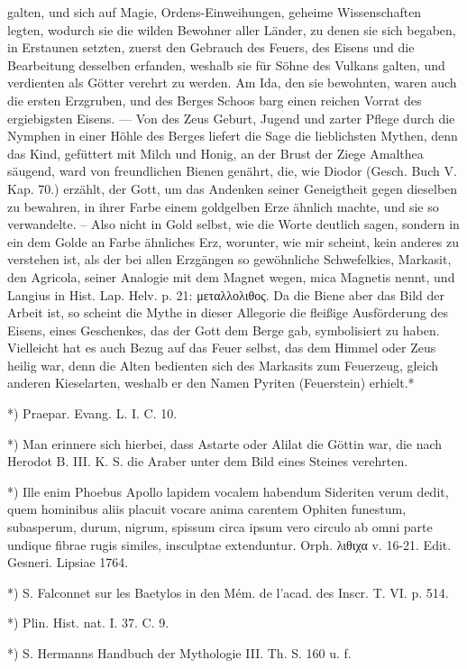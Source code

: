 \documentclass[a4paper, 11pt, oneside, polutonikogreek, german]{article}
\begin{document}
galten, und sich auf Magie, Ordens-Einweihungen, geheime Wissenschaften legten, wodurch sie die wilden Bewohner aller Länder, zu denen sie sich begaben, in Erstaunen setzten, zuerst den Gebrauch des Feuers, des Eisens und die Bearbeitung desselben erfanden, weshalb sie für Söhne des Vulkans galten, und verdienten als Götter verehrt zu werden. Am Ida, den sie bewohnten, waren auch die ersten Erzgruben, und des Berges Schoos barg einen reichen Vorrat des ergiebigsten Eisens. --- Von des Zeus Geburt, Jugend und zarter Pflege durch die Nymphen in einer Höhle des Berges liefert die Sage die lieblichsten Mythen, denn das Kind, gefüttert mit Milch und Honig, an der Brust der Ziege Amalthea säugend, ward von freundlichen Bienen genährt, die, wie Diodor (Gesch. Buch V. Kap. 70.) erzählt, der Gott, um das Andenken seiner Geneigtheit gegen dieselben zu bewahren, in ihrer Farbe einem goldgelben Erze ähnlich machte, und sie so verwandelte. -- Also nicht in Gold selbst, wie die Worte deutlich sagen, sondern in ein dem Golde an Farbe ähnliches Erz, worunter, wie mir scheint, kein anderes zu verstehen ist, als der bei allen Erzgängen so gewöhnliche Schwefelkies, Markasit, den Agricola, seiner Analogie mit dem Magnet wegen, mica Magnetis nennt, und Langius in Hist. Lap. Helv. p. 21: μεταλλολιθος. Da die Biene aber das Bild der Arbeit ist, so scheint die Mythe in dieser Allegorie die fleißige Ausförderung des Eisens, eines Geschenkes, das der Gott dem Berge gab, symbolisiert zu haben. Vielleicht hat es auch Bezug auf das Feuer selbst, das dem Himmel oder Zeus heilig war, denn die Alten bedienten sich des Markasits zum Feuerzeug, gleich anderen Kieselarten, weshalb er den Namen Pyriten (Feuerstein) erhielt.*

*) Praepar. Evang. L. I. C. 10.

*) Man erinnere sich hierbei, dass Astarte oder Alilat die Göttin war, die nach Herodot B. III. K. S. die Araber unter dem Bild eines Steines verehrten.

*) Ille enim Phoebus Apollo lapidem vocalem habendum Sideriten verum dedit, quem hominibus aliis placuit vocare anima carentem Ophiten funestum, subasperum, durum, nigrum, spissum circa ipsum vero circulo ab omni parte undique fibrae rugis similes, insculptae extenduntur.
Orph. λιθιχα v. 16-21.
Edit. Gesneri. Lipsiae 1764.

*) S. Falconnet sur les Baetylos in den Mém. de l'acad. des Inscr. T. VI. p. 514.

*) Plin. Hist. nat. I. 37. C. 9.

*) S. Hermanns Handbuch der Mythologie III. Th. S. 160 u. f.
\end{document}
